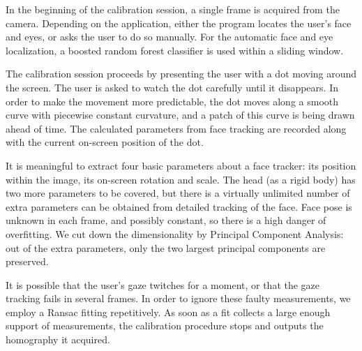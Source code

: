 In the beginning of the calibration session, a single frame is acquired from the camera.
Depending on the application, either the program locates the user's face and eyes, or asks the user to do so manually.
For the automatic face and eye localization, a boosted random forest classifier is used within a sliding window.

The calibration session proceeds by presenting the user with a dot moving around the screen.
The user is asked to watch the dot carefully until it disappears.
In order to make the movement more predictable, the dot moves along a smooth curve with piecewise constant curvature, and a patch of this curve is being drawn ahead of time.
The calculated parameters from face tracking are recorded along with the current on-screen position of the dot.

It is meaningful to extract four basic parameters about a face tracker: its position within the image, its on-screen rotation and scale.
The head (as a rigid body) has two more parameters to be covered, but there is a virtually unlimited number of extra parameters can be obtained from detailed tracking of the face.
Face pose is unknown in each frame, and possibly constant, so there is a high danger of overfitting.
We cut down the dimensionality by Principal Component Analysis: out of the extra parameters, only the two largest principal components are preserved.

It is possible that the user's gaze twitches for a moment, or that the gaze tracking fails in several frames.
In order to ignore these faulty measurements, we employ a Ransac fitting repetitively.
As soon as a fit collects a large enough support of measurements, the calibration procedure stops and outputs the homography it acquired.

